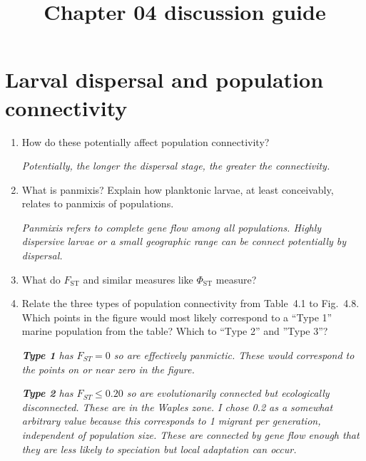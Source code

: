 \documentclass[letterpaper]{tufte-handout}
\title{Chapter 04 discussion guide}
\date{} %
\begin{document}
\maketitle	%

\section*{Larval dispersal and population connectivity}

\begin{enumerate}


	\item How do these potentially affect population connectivity?
	
	\textit{Potentially, the longer the dispersal stage, the greater the connectivity.}
	
	\item What is panmixis? Explain how planktonic larvae, at least conceivably, relates to panmixis of populations.
	
	\textit{Panmixis refers to complete gene flow among all 
	populations. Highly dispersive larvae or a small geographic 
	range can be connect potentially by dispersal.}
	
	\item What do $F_\mathrm{ST}$  and similar measures like $\Phi_{\mathrm{ST}}$ measure? 
	
	\item Relate the three types of population connectivity from Table~4.1 to Fig.~4.8. Which points in the figure would most likely correspond to a “Type 1” marine population from the table? Which to “Type 2” and ”Type 3”?
	
	
	\textit{\textbf{Type 1} has $F_{ST} = 0$ so are effectively panmictic. These would correspond to the points on or near zero in the figure.}
	
	\textit{\textbf{Type 2} has $F_{ST} \le 0.20$ so are evolutionarily connected but ecologically disconnected. These are in the Waples zone. I chose 0.2 as a somewhat arbitrary value because this corresponds to 1 migrant per generation, independent of population size. These are connected by gene flow enough that they are less likely to speciation but local adaptation can occur.}
	

\end{enumerate}
\end{document}
